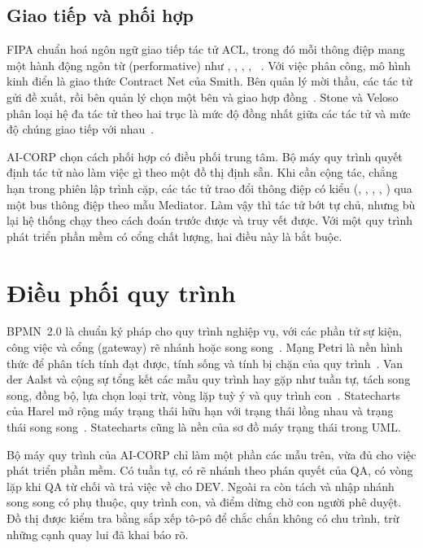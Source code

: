 \subsection{Giao tiếp và phối hợp}

FIPA chuẩn hoá ngôn ngữ giao tiếp tác tử ACL, trong đó mỗi thông điệp mang một hành động ngôn từ (performative) như , , , , ~\cite{fipa2002}. Với việc phân công, mô hình kinh điển là giao thức Contract Net của Smith. Bên quản lý mời thầu, các tác tử gửi đề xuất, rồi bên quản lý chọn một bên và giao hợp đồng~\cite{smith1980}. Stone và Veloso phân loại hệ đa tác tử theo hai trục là mức độ đồng nhất giữa các tác tử và mức độ chúng giao tiếp với nhau~\cite{stone2000}.

AI-CORP chọn cách phối hợp có điều phối trung tâm. Bộ máy quy trình quyết định tác tử nào làm việc gì theo một đồ thị định sẵn. Khi cần cộng tác, chẳng hạn trong phiên lập trình cặp, các tác tử trao đổi thông điệp có kiểu (, , , , ) qua một bus thông điệp theo mẫu Mediator. Làm vậy thì tác tử bớt tự chủ, nhưng bù lại hệ thống chạy theo cách đoán trước được và truy vết được. Với một quy trình phát triển phần mềm có cổng chất lượng, hai điều này là bắt buộc.

\section{Điều phối quy trình}

BPMN~2.0 là chuẩn ký pháp cho quy trình nghiệp vụ, với các phần tử sự kiện, công việc và cổng (gateway) rẽ nhánh hoặc song song~\cite{omg2011bpmn}. Mạng Petri là nền hình thức để phân tích tính đạt được, tính sống và tính bị chặn của quy trình~\cite{murata1989}. Van der Aalst và cộng sự tổng kết các mẫu quy trình hay gặp như tuần tự, tách song song, đồng bộ, lựa chọn loại trừ, vòng lặp tuỳ ý và quy trình con~\cite{aalst2003}. Statecharts của Harel mở rộng máy trạng thái hữu hạn với trạng thái lồng nhau và trạng thái song song~\cite{harel1987}. Statecharts cũng là nền của sơ đồ máy trạng thái trong UML.

Bộ máy quy trình của AI-CORP chỉ làm một phần các mẫu trên, vừa đủ cho việc phát triển phần mềm. Có tuần tự, có rẽ nhánh theo phán quyết của QA, có vòng lặp khi QA từ chối và trả việc về cho DEV. Ngoài ra còn tách và nhập nhánh song song có phụ thuộc, quy trình con, và điểm dừng chờ con người phê duyệt. Đồ thị được kiểm tra bằng sắp xếp tô-pô để chắc chắn không có chu trình, trừ những cạnh quay lui đã khai báo rõ.

